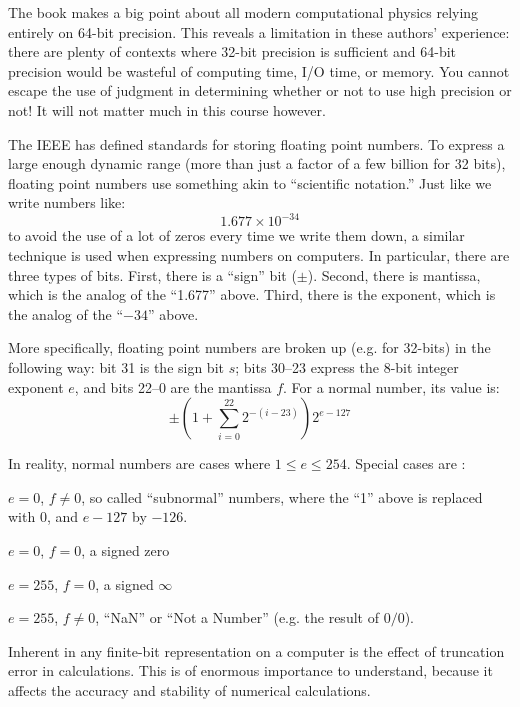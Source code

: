 The book makes a big point about all modern computational physics
relying entirely on 64-bit precision. This reveals a limitation in
these authors' experience: there are plenty of contexts where 32-bit
precision is sufficient and 64-bit precision would be wasteful of
computing time, I/O time, or memory. You cannot escape the use of
judgment in determining whether or not to use high precision or not!
It will not matter much in this course however.

The IEEE has defined standards for storing floating point numbers.  To
express a large enough dynamic range (more than just a factor of a few
billion for 32 bits), floating point numbers use something akin to
``scientific notation.'' Just like we write numbers like:
\begin{equation}
1.677 \times 10^{-34}
\end{equation}
to avoid the use of a lot of zeros every time we write them down, a
similar technique is used when expressing numbers on computers. In
particular, there are three types of bits. First, there is a ``sign''
bit ($\pm$). Second, there is mantissa, which is the analog of the
``1.677'' above. Third, there is the exponent, which is the analog of
the ``$-34$'' above.

More specifically, floating point numbers are broken up (e.g. for
32-bits) in the following way: bit 31 is the sign bit $s$; bits 30--23
express the 8-bit integer exponent $e$, and bits 22--0 are the
mantissa $f$. For a normal number, its value is:
\begin{equation}
\pm \left(1 + \sum_{i=0}^{22} 2^{-(i-23)} \right) 2^{e-127}
\end{equation}

In reality, normal numbers are cases where $1\le e \le 254$. Special
cases are :
\begin{ditemize}
\item $e=0$, $f\ne 0$, so called ``subnormal'' numbers, where the
  ``1'' above is replaced with 0, and $e-127$ by $-126$.
\item $e=0$, $f=0$, a signed zero
\item $e=255$, $f=0$, a signed $\infty$
\item $e=255$, $f\ne 0$, ``NaN'' or ``Not a Number'' (e.g. the result
  of $0/0$).
\end{ditemize}

Inherent in any finite-bit representation on a computer is the effect
of truncation error in calculations. This is of enormous importance to
understand, because it affects the accuracy and stability of numerical
calculations. 

